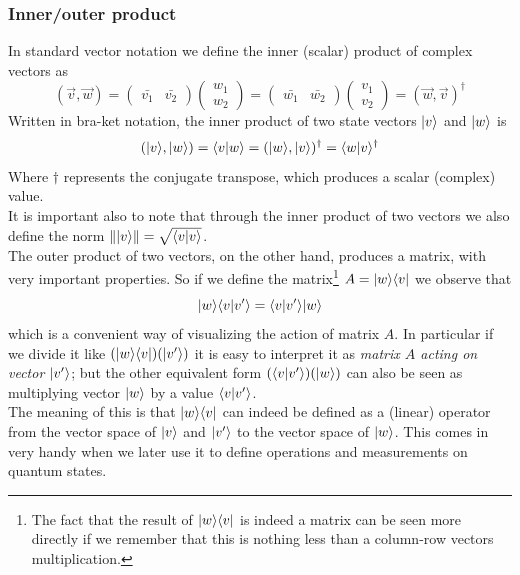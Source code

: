 	\subsubsection*{Inner/outer product}
	In standard vector notation we define the inner (scalar) product of complex vectors as
	$$ ( \vec{v}, \vec{w} ) =  \begin{pmatrix} \bar{v_1} & \bar{v_2}\end{pmatrix} \begin{pmatrix} w_1 \\ w_2 \end{pmatrix} = \begin{pmatrix} \bar{w_1} & \bar{w_2}\end{pmatrix} \begin{pmatrix} v_1 \\ v_2 \end{pmatrix} = ( \vec{w}, \vec{v} )^{\dagger}$$
	Written in bra-ket notation, the inner product of two state vectors $|v \rangle$ and $|w \rangle$ is
	$$ ( |v \rangle , |w \rangle ) = \langle v|w\rangle = (|w \rangle , |v \rangle )^{\dagger} = \langle w|v\rangle^{\dagger} $$
	Where $\dagger$ represents the conjugate transpose,	which produces a scalar (complex) value.\\ %
	
	It is important also to note that through the inner product of two vectors we also define the norm $\||v \rangle\|  =  \sqrt{\langle v|v\rangle} $.\\
	
	
	The outer product of two vectors, on the other hand, produces a matrix, with very important properties. So if we define the matrix\footnote{The fact that the result of  $ |w \rangle\langle v| $ is indeed a matrix can be seen more directly if we remember that this is nothing less than a column-row vectors multiplication.} $A =  |w \rangle\langle v| $ we observe that
	$$ |w \rangle\langle v|v'\rangle = \langle v|v'\rangle|w \rangle $$	
	which is a convenient way of visualizing the action of matrix $A$. In particular if we divide it like $(|w \rangle\langle v|) (|v' \rangle) $ it is easy to interpret it as \textit{matrix $A$ acting on vector $|v' \rangle$}; but the other equivalent form $(\langle v|v'\rangle)(|w \rangle)$ can also be seen as multiplying vector $|w \rangle$ by a value $\langle v|v'\rangle$. \\
	The meaning of this is that $|w \rangle\langle v|$ can indeed be defined as a (linear) operator from the vector space of $|v \rangle$ and $|v' \rangle$ to the vector space of $|w \rangle$. This comes in very handy when we later use it to define operations and measurements on quantum states.\\ %
	
